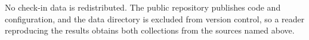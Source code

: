 No check-in data is redistributed. The public repository publishes code and
configuration, and the data directory is excluded from version control, so a reader
reproducing the results obtains both collections from the sources named above.

